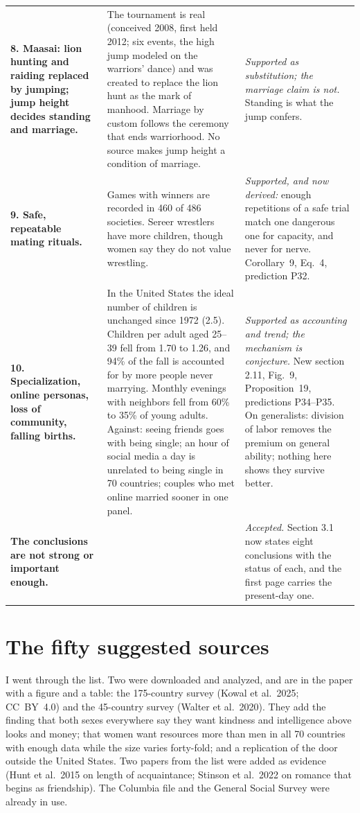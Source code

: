 \documentclass[10pt,letterpaper]{extarticle}
\newcommand{\lab}[1]{\textbf{#1}}
\begin{document}
{\begin{longtable}{@{}P{0.20\textwidth}P{0.42\textwidth}P{0.31\textwidth}@{}}
\lab{8. Maasai: lion hunting and raiding replaced by jumping; jump height decides standing and marriage.} & The tournament is real (conceived 2008, first held 2012; six events, the high jump modeled on the warriors' dance) and was created to replace the lion hunt as the mark of manhood. Marriage by custom follows the ceremony that ends warriorhood. No source makes jump height a condition of marriage. & \emph{Supported as substitution; the marriage claim is not.} Standing is what the jump confers.\\
\lab{9. Safe, repeatable mating rituals.} & Games with winners are recorded in 460 of 486 societies. Sereer wrestlers have more children, though women say they do not value wrestling. & \emph{Supported, and now derived:} enough repetitions of a safe trial match one dangerous one for capacity, and never for nerve. Corollary~9, Eq.~4, prediction P32.\\
\lab{10. Specialization, online personas, loss of community, falling births.} & In the United States the ideal number of children is unchanged since 1972 (2.5). Children per adult aged 25--39 fell from 1.70 to 1.26, and 94\% of the fall is accounted for by more people never marrying. Monthly evenings with neighbors fell from 60\% to 35\% of young adults. Against: seeing friends goes with being single; an hour of social media a day is unrelated to being single in 70 countries; couples who met online married sooner in one panel. & \emph{Supported as accounting and trend; the mechanism is conjecture.} New section 2.11, Fig.~9, Proposition~19, predictions P34--P35. On generalists: division of labor removes the premium on general ability; nothing here shows they survive better.\\
\lab{The conclusions are not strong or important enough.} & & \emph{Accepted.} Section 3.1 now states eight conclusions with the status of each, and the first page carries the present-day one.\\
\bottomrule
\end{longtable}}

\section{The fifty suggested sources}

I went through the list. Two were downloaded and analyzed, and are in the paper with a figure and a table: the
175-country survey (Kowal et al.\ 2025; CC~BY~4.0) and the 45-country survey (Walter et al.\ 2020). They add the finding
that both sexes everywhere say they want kindness and intelligence above looks and money; that women want resources more
than men in all 70 countries with enough data while the size varies forty-fold; and a replication of the door outside the
United States. Two papers from the list were added as evidence (Hunt et al.\ 2015 on length of acquaintance; Stinson et
al.\ 2022 on romance that begins as friendship). The Columbia file and the General Social Survey were already in use.
\end{document}

